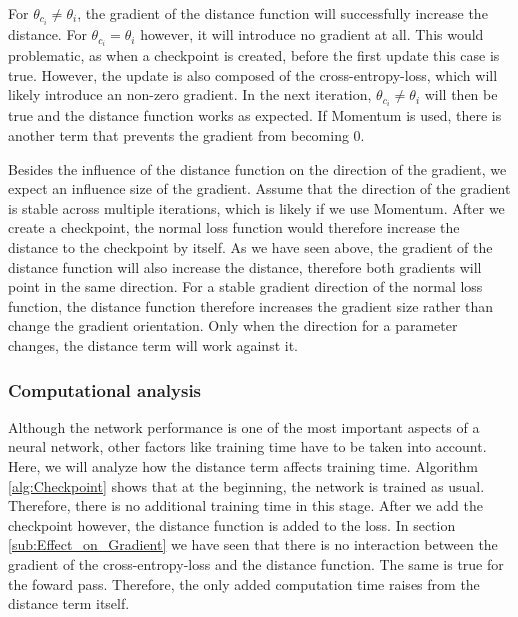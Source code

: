 For $\theta_{c_i} \neq \theta_i$, the gradient of the distance function will
successfully increase the distance. For $\theta_{c_i} = \theta_i$ however, it
will introduce no gradient at all. This would problematic, as when a checkpoint
is created, before the first update this case is true. However, the update is
also composed of the cross-entropy-loss, which will likely introduce an non-zero
gradient. In the next iteration, $\theta_{c_i} \neq \theta_i$ will then be true
and the distance function works as expected. If Momentum is used, there is
another term that prevents the gradient from becoming 0.


Besides the influence of the distance function on the direction of the gradient,
we expect an influence size of the gradient. Assume that the direction of the
gradient is stable across multiple iterations, which is likely if we use
Momentum. After we create a checkpoint, the normal loss function would therefore
increase the distance to the checkpoint by itself. As we have seen above, the
gradient of the distance function will also increase the distance, therefore
both gradients will point in the same direction. For a stable gradient direction
of the normal loss function, the distance function therefore increases the
gradient size rather than change the gradient orientation. Only when the
direction for a parameter changes, the distance term will work against it.

\subsubsection{Computational analysis}\label{sub:Computational_Analysis}
Although the network performance is one of the most important aspects of a
neural network, other factors like training time have to be taken into account.
Here, we will analyze how the distance term affects training time. Algorithm
\ref{alg:Checkpoint} shows that at the beginning, the network is trained as
usual. Therefore, there is no additional training time in this stage. After we
add the checkpoint however, the distance function is added to the loss. In
section \ref{sub:Effect_on_Gradient} we have seen that there is no interaction
between the gradient of the cross-entropy-loss and the distance function. The
same is true for the foward pass. Therefore, the only added computation time
raises from the distance term itself.


